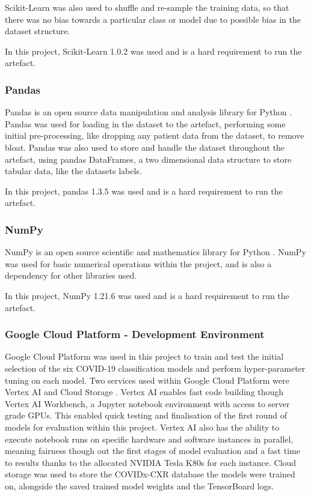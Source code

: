 Scikit-Learn was also used to shuffle and re-sample the training data, so that there was no bias towards a particular class or model due to possible bias in the dataset structure.

In this project, Scikit-Learn 1.0.2 was used and is a hard requirement to run the artefact.

\subsubsection{Pandas}
Pandas is an open source data manipulation and analysis library for Python \citep{pandasPy63:online}. Pandas was used for loading in the dataset to the artefact, performing some initial pre-processing, like dropping any patient data from the dataset, to remove bloat. Pandas was also used to store and handle the dataset throughout the artefact, using pandas DataFrames, a two dimensional data structure to store tabular data, like the datasets labels.

In this project, pandas 1.3.5 was used and is a hard requirement to run the artefact.

\subsubsection{NumPy}
NumPy is an open source scientific and mathematics library for Python \citep{NumPy90:online}. NumPy was used for basic numerical operations within the project, and is also a dependency for other libraries used. 

In this project, NumPy 1.21.6 was used and is a hard requirement to run the artefact.

\subsubsection{Google Cloud Platform - Development Environment}
Google Cloud Platform was used in this project to train and test the initial selection of the six COVID-19 classification models and perform hyper-parameter tuning on each model. Two services used within Google Cloud Platform were Vertex AI \citep{VertexAI57:online} and Cloud Storage \citep{CloudSto72:online}. Vertex AI enables fast code building though Vertex AI Workbench, a Jupyter notebook environment with access to server grade GPUs. This enabled quick testing and finalisation of the first round of models for evaluation within this project. Vertex AI also has the ability to execute notebook runs on specific hardware and software instances in parallel, meaning fairness though out the first stages of model evaluation and a fast time to results thanks to the allocated NVIDIA Tesla K80s for each instance. Cloud storage was used to store the COVIDx-CXR database the models were trained on, alongside the saved trained model weights and the TensorBoard logs.

